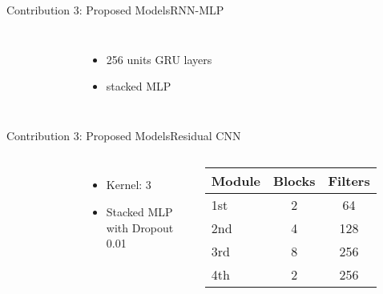 \begin{frame}{Contribution 3: Proposed Models}{RNN-MLP}
    \begin{columns}
        \begin{figure}
            
        \end{figure}

        \begin{itemize}
            \item 256 units GRU layers
            \item stacked MLP
        \end{itemize}
    \end{columns}
\end{frame}

\begin{frame}{Contribution 3: Proposed Models}{Residual CNN}
    \begin{columns}
        \begin{figure}
            
            
        \end{figure}

        \begin{itemize}
            \item Kernel: 3
            \item Stacked MLP with Dropout 0.01
        \end{itemize}
        \begin{tabular}{lSS}
            \hline
            Module & {Blocks} & {Filters} \\
            \hline
            1st    & 2        & 64        \\
            2nd    & 4        & 128       \\
            3rd    & 8        & 256       \\
            4th    & 2        & 256       \\
            \hline
        \end{tabular}
    \end{columns}

\end{frame}


